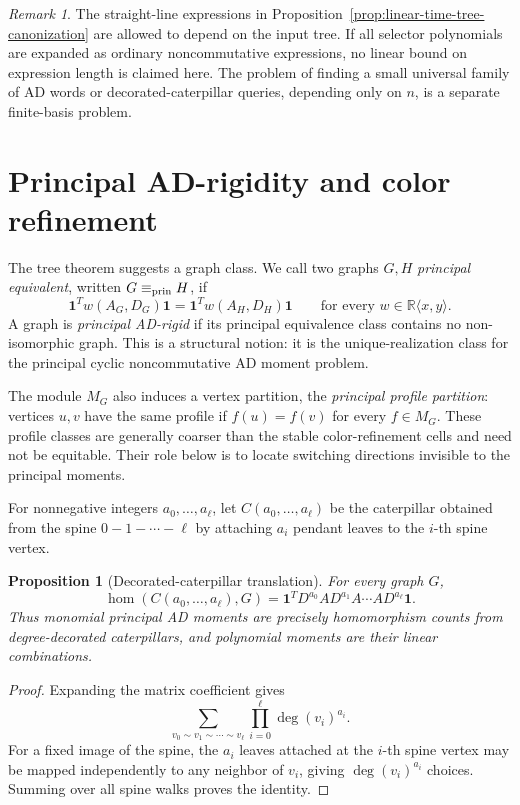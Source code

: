 \documentclass[a4paper,fleqn]{cas-sc}
\newtheorem{proposition}[theorem]{Proposition}
\theoremstyle{definition}
\theoremstyle{remark}
\newtheorem{remark}[theorem]{Remark}
\newcommand{\R}{\mathbb R}
\newcommand{\one}{\mathbf 1}
\newcommand{\homG}{\operatorname{hom}}
\begin{document}
\begin{remark}
The straight-line expressions in Proposition~\ref{prop:linear-time-tree-canonization} are
allowed to depend on the input tree.  If all selector polynomials are expanded as
ordinary noncommutative expressions, no linear bound on expression length is
claimed here.  The problem of finding a small universal family of AD words or
decorated-caterpillar queries, depending only on $n$, is a separate finite-basis
problem.
\end{remark}



\section{Principal AD-rigidity and color refinement}
\label{sec:caterpillar-rigidity}

The tree theorem suggests a graph class.  We call two graphs $G,H$ \emph{principal
equivalent}, written $G\equiv_{\rm prin}H$, if
\[
        \one^Tw(A_G,D_G)\one=\one^Tw(A_H,D_H)\one
        \qquad\text{for every }w\in\R\langle x,y\rangle .
\]
A graph is \emph{principal AD-rigid} if its principal equivalence class contains
no non-isomorphic graph.  This is a structural notion: it is the unique-realization
class for the principal cyclic noncommutative AD moment problem.

The module $M_G$ also induces a vertex partition, the \emph{principal profile
partition}: vertices $u,v$ have the same profile if $f(u)=f(v)$ for every
$f\in M_G$.  These profile classes are generally coarser than the stable
color-refinement cells and need not be equitable.  Their role below is to locate
switching directions invisible to the principal moments.

For nonnegative integers $a_0,\ldots,a_\ell$, let $C(a_0,\ldots,a_\ell)$ be the
caterpillar obtained from the spine $0-1-\cdots-\ell$ by attaching $a_i$ pendant
leaves to the $i$-th spine vertex.

\begin{proposition}[Decorated-caterpillar translation]
\label{prop:caterpillar-translation}
For every graph $G$,
\[
        \homG(C(a_0,\ldots,a_\ell),G)
        =
        \one^TD^{a_0}AD^{a_1}A\cdots AD^{a_\ell}\one .
\]
Thus monomial principal AD moments are precisely homomorphism counts from
degree-decorated caterpillars, and polynomial moments are their linear
combinations.
\end{proposition}

\begin{proof}
Expanding the matrix coefficient gives
\[
        \sum_{v_0\sim v_1\sim\cdots\sim v_\ell}
        \prod_{i=0}^{\ell}\deg(v_i)^{a_i}.
\]
For a fixed image of the spine, the $a_i$ leaves attached at the $i$-th spine
vertex may be mapped independently to any neighbor of $v_i$, giving
$\deg(v_i)^{a_i}$ choices.  Summing over all spine walks proves the identity.
\end{proof}
\end{document}
